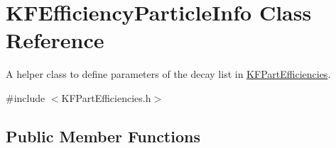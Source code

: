 \hypertarget{classKFEfficiencyParticleInfo}{}\section{K\+F\+Efficiency\+Particle\+Info Class Reference}
\label{classKFEfficiencyParticleInfo}


A helper class to define parameters of the decay list in \hyperlink{classKFPartEfficiencies}{K\+F\+Part\+Efficiencies}.  




{\ttfamily \#include $<$K\+F\+Part\+Efficiencies.\+h$>$}

\subsection*{Public Member Functions}
